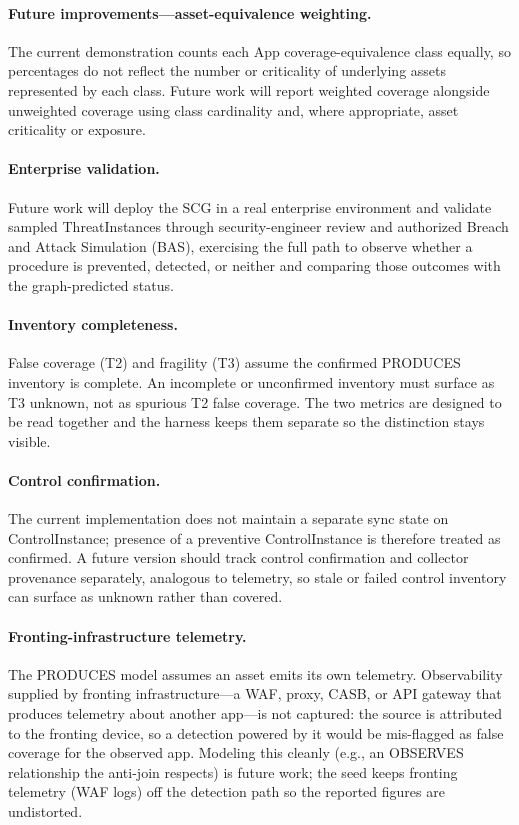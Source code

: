 \documentclass[10pt]{article}
\begin{document}
\paragraph{Future improvements---asset-equivalence weighting.} The current demonstration counts each App coverage-equivalence class equally, so percentages do not reflect the number or criticality of underlying assets represented by each class. Future work will report weighted coverage alongside unweighted coverage using class cardinality and, where appropriate, asset criticality or exposure.

\paragraph{Enterprise validation.} Future work will deploy the SCG in a real enterprise environment and validate sampled ThreatInstances through security-engineer review and authorized Breach and Attack Simulation (BAS), exercising the full path to observe whether a procedure is prevented, detected, or neither and comparing those outcomes with the graph-predicted status.

\paragraph{Inventory completeness.} False coverage (T2) and fragility (T3) assume the confirmed PRODUCES inventory is complete. An incomplete or unconfirmed inventory must surface as T3 unknown, not as spurious T2 false coverage. The two metrics are designed to be read together and the harness keeps them separate so the distinction stays visible.

\paragraph{Control confirmation.} The current implementation does not maintain a separate sync state on ControlInstance; presence of a preventive ControlInstance is therefore treated as confirmed. A future version should track control confirmation and collector provenance separately, analogous to telemetry, so stale or failed control inventory can surface as unknown rather than covered.

\paragraph{Fronting-infrastructure telemetry.} The PRODUCES model assumes an asset emits its own telemetry. Observability supplied by fronting infrastructure---a WAF, proxy, CASB, or API gateway that produces telemetry about another app---is not captured: the source is attributed to the fronting device, so a detection powered by it would be mis-flagged as false coverage for the observed app. Modeling this cleanly (e.g., an OBSERVES relationship the anti-join respects) is future work; the seed keeps fronting telemetry (WAF logs) off the detection path so the reported figures are undistorted.
\end{document}
